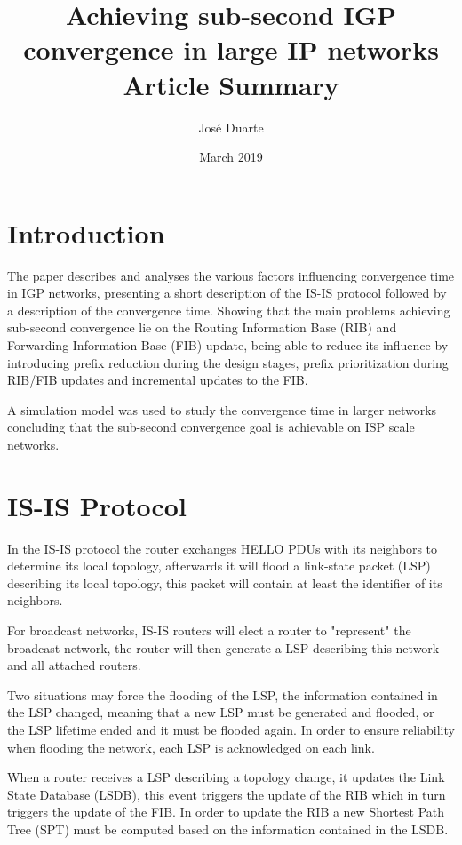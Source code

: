 \documentclass[a4paper, 11pt]{article}
\title{%
Achieving sub-second IGP convergence in large IP networks \\
	\large Article Summary}
\author{José Duarte}
\date{March 2019}
\begin{document}
\maketitle

\section{Introduction}
The paper describes and analyses the various factors influencing convergence time in IGP networks,
presenting a short description of the IS-IS protocol followed by a description of the convergence time.
Showing that the main problems achieving sub-second convergence lie on the Routing Information Base (RIB) and
Forwarding Information Base (FIB) update, 
being able to reduce its influence by introducing prefix reduction during the design stages, 
prefix prioritization during RIB/FIB updates and incremental updates to the FIB.

A simulation model was used to study the convergence time in larger networks concluding that the sub-second convergence goal is achievable on ISP scale networks.

\section{IS-IS Protocol}
In the IS-IS protocol the router exchanges HELLO PDUs with its neighbors to determine its local topology, 
afterwards it will flood a link-state packet (LSP) describing its local topology, 
this packet will contain at least the identifier of its neighbors.

For broadcast networks, IS-IS routers will elect a router to "represent" the broadcast network, 
the router will then generate a LSP describing this network and all attached routers.

Two situations may force the flooding of the LSP, 
the information contained in the LSP changed, meaning that a new LSP must be generated and flooded, 
or the LSP lifetime ended and it must be flooded again.
In order to ensure reliability when flooding the network, each LSP is acknowledged on each link.

When a router receives a LSP describing a topology change, it updates the Link State Database (LSDB), 
this event triggers the update of the RIB
which in turn triggers the update of the FIB.
In order to update the RIB a new Shortest Path Tree (SPT) 
must be computed based on the information contained in the LSDB.
\end{document}
